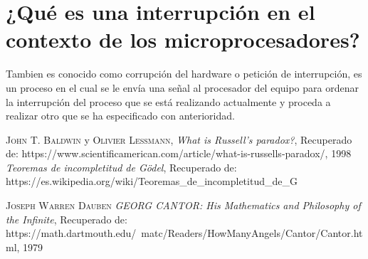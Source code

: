 \documentclass{article}
\begin{document}
\newpage
\Large
\section{¿Qué es una interrupción en el contexto de los microprocesadores?}

Tambien es conocido como corrupción del hardware o petición de interrupción, es un proceso en el cual se le envía una señal al procesador del equipo para ordenar la interrupción del proceso que se está realizando actualmente y proceda a realizar otro que se ha especificado con anterioridad. 


\newline


\newpage

\begin{thebibliography}{X}
 \textsc{John T. Baldwin} y \textsc{Olivier Lessmann},
\textit{What is Russell's paradox?}, Recuperado de: https://www.scientificamerican.com/article/what-is-russells-paradox/,
1998
\textit{Teoremas de incompletitud de Gödel}, Recuperado de: https://es.wikipedia.org/wiki/Teoremas_de_incompletitud_de_G%

 \textsc{Joseph Warren Dauben} 
\textit{GEORG CANTOR: His Mathematics and Philosophy of the Infinite}, Recuperado de: https://math.dartmouth.edu/~matc/Readers/HowManyAngels/Cantor/Cantor.html, 1979

\end{thebibliography}
\end{document}
